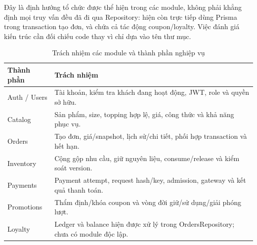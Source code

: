 Đây là định hướng tổ chức được thể hiện trong các module, không phải
khẳng định mọi truy vấn đều đã đi qua Repository: 
hiện còn trực tiếp dùng Prisma trong transaction tạo đơn, và
 chứa cả tác động coupon/loyalty.
Việc đánh giá kiến trúc cần đối chiếu code thay vì chỉ dựa vào tên thư mục.

\begin{table}[H]
\centering\small
\caption{Trách nhiệm các module và thành phần nghiệp vụ}
\label{tab:modules}
\begin{tabularx}{\textwidth}{@{}L{0.22\textwidth}Y@{}}
\toprule\textbf{Thành phần} & \textbf{Trách nhiệm} \\\midrule
Auth / Users & Tài khoản, kiểm tra khách đang hoạt động, JWT, role và quyền sở hữu. \\
Catalog & Sản phẩm, size, topping hợp lệ, giá, công thức và khả năng phục vụ. \\
Orders & Tạo đơn, giá/snapshot, lịch sử/chi tiết, phối hợp transaction và hết hạn. \\
Inventory & Cộng gộp nhu cầu, giữ nguyên liệu, consume/release và kiểm soát version. \\
Payments & Payment attempt, request hash/key, admission, gateway và kết quả thanh toán. \\
Promotions & Thẩm định/khóa coupon và vòng đời giữ/sử dụng/giải phóng lượt. \\
Loyalty & Ledger và balance hiện được xử lý trong OrdersRepository; chưa có module độc lập. \\
\bottomrule
\end{tabularx}
\end{table}

